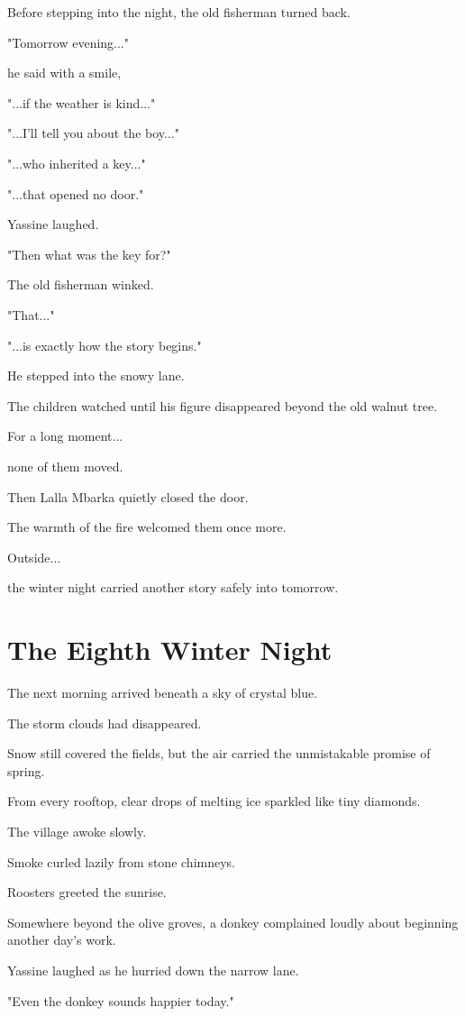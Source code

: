\documentclass[12pt,openany]{book}
\begin{document}
Before stepping into the night, the old fisherman turned back.

"Tomorrow evening..."

he said with a smile,

"...if the weather is kind..."

"...I'll tell you about the boy..."

"...who inherited a key..."

"...that opened no door."

Yassine laughed.

"Then what was the key for?"

The old fisherman winked.

"That..."

"...is exactly how the story begins."

He stepped into the snowy lane.

The children watched until his figure disappeared beyond the old walnut tree.

For a long moment...

none of them moved.

Then Lalla Mbarka quietly closed the door.

The warmth of the fire welcomed them once more.

Outside...

the winter night carried another story safely into tomorrow.
\chapter{The Eighth Winter Night}

The next morning arrived beneath a sky of crystal blue.

The storm clouds had disappeared.

Snow still covered the fields, but the air carried the unmistakable promise of spring.

From every rooftop, clear drops of melting ice sparkled like tiny diamonds.

The village awoke slowly.

Smoke curled lazily from stone chimneys.

Roosters greeted the sunrise.

Somewhere beyond the olive groves, a donkey complained loudly about beginning another day's work.

Yassine laughed as he hurried down the narrow lane.

"Even the donkey sounds happier today."
\end{document}

